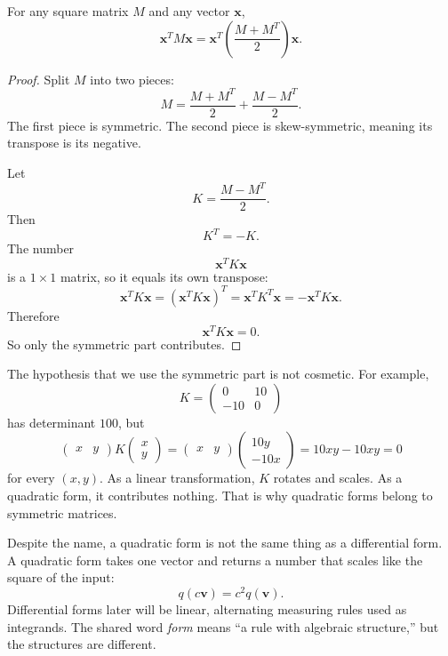 \begin{theorem}
For any square matrix \(M\) and any vector \(\mathbf x\),
\[
\boxed{
    \mathbf x^T M\mathbf x
    =
    \mathbf x^T\left(\frac{M+M^T}{2}\right)\mathbf x.
}
\]
\end{theorem}

\begin{proof}
Split \(M\) into two pieces:
\[
    M=
    \frac{M+M^T}{2}
    +
    \frac{M-M^T}{2}.
\]
The first piece is symmetric.  The second piece is skew-symmetric, meaning its
transpose is its negative.

Let
\[
    K=\frac{M-M^T}{2}.
\]
Then
\[
    K^T=-K.
\]
The number
\[
    \mathbf x^TK\mathbf x
\]
is a \(1\times1\) matrix, so it equals its own transpose:
\[
    \mathbf x^TK\mathbf x
    =
    (\mathbf x^TK\mathbf x)^T
    =
    \mathbf x^TK^T\mathbf x
    =
    -\mathbf x^TK\mathbf x.
\]
Therefore
\[
    \mathbf x^TK\mathbf x=0.
\]
So only the symmetric part contributes.
\end{proof}

The hypothesis that we use the symmetric part is not cosmetic.  For example,
\[
    K=
    \begin{pmatrix}
        0&10\\
        -10&0
    \end{pmatrix}
\]
has determinant \(100\), but
\[
    \begin{pmatrix}x&y\end{pmatrix}
    K
    \begin{pmatrix}
        x\\y
    \end{pmatrix}
    =
    \begin{pmatrix}x&y\end{pmatrix}
    \begin{pmatrix}
        10y\\
        -10x
    \end{pmatrix}
    =
    10xy-10xy
    =
    0
\]
for every \((x,y)\).  As a linear transformation, \(K\) rotates and scales.  As a
quadratic form, it contributes nothing.  That is why quadratic forms belong to
symmetric matrices.

Despite the name, a quadratic form is not the same thing as a differential form.  A
quadratic form takes one vector and returns a number that scales like the square of the
input:
\[
    q(c\mathbf v)=c^2q(\mathbf v).
\]
Differential forms later will be linear, alternating measuring rules used as integrands.
The shared word \emph{form} means ``a rule with algebraic structure,'' but the structures
are different.

